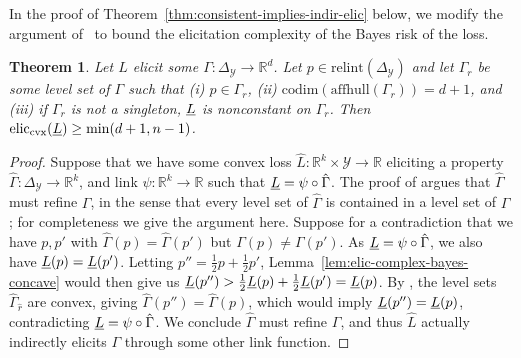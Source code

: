 \documentclass{article}
\newcommand{\reals}{\mathbb{R}}
\newcommand{\simplex}{\Delta_\Y}
\newcommand{\relint}[1]{\mathrm{relint}(#1)}
\newcommand{\eliccvx}{\mathrm{elic}_\mathrm{cvx}}
\newcommand{\codim}{\mathrm{codim}}
\newcommand{\affhull}{\mathrm{affhull}}
\newcommand{\Y}{\mathcal{Y}}
\newtheorem{theorem}{Theorem}
\begin{document}
In the proof of Theorem~\ref{thm:consistent-implies-indir-elic} below, we modify the argument of~\citet[Corollary 7]{frongillo2018elicitation} to bound the elicitation complexity of the Bayes risk of the loss.
\begin{theorem}
  \label{thm:bayes-risk-lower-bound}
  Let $L$ elicit some $\Gamma:\simplex\to\reals^d$.
  Let $p\in\relint\simplex$ and let $\Gamma_r$ be some level set of $\Gamma$ such that (i) $p\in\Gamma_r$, (ii) $\codim(\affhull(\Gamma_r))=d+1$, and (iii) if $\Gamma_r$ is not a singleton, $\underline{L}$ is nonconstant on $\Gamma_r$.
  Then $\eliccvx(\lbar) \geq \min(d+1,n-1)$.
\end{theorem}
\begin{proof}
  Suppose that we have some convex loss $\hat L:\reals^k\times\Y\to\reals$ eliciting a property $\hat\Gamma:\simplex\to\reals^k$, and link $\psi : \reals^k \to \reals$ such that $\underline{L} = \psi \circ \hat\Gamma$.
  The proof of \citet[Theorem 4]{frongillo2018elicitation} argues that $\hat\Gamma$ must refine $\Gamma$, in the sense that every level set of $\hat\Gamma$ is contained in a level set of $\Gamma$; for completeness we give the argument here.
  Suppose for a contradiction that we have $p,p'$ with $\hat\Gamma(p)=\hat\Gamma(p')$ but $\Gamma(p) \neq \Gamma(p')$.
  As $\underline{L} = \psi \circ \hat\Gamma$, we also have $\underline{L}(p) = \underline{L}(p')$.
  Letting $p'' = \tfrac 1 2 p +  \tfrac 1 2 p'$, Lemma~\ref{lem:elic-complex-bayes-concave} would then give us $\underline{L}(p'') >  \tfrac 1 2 \underline{L}(p) +  \tfrac 1 2 \underline{L}(p') = \underline{L}(p)$.
  By \citet{osband1985providing}, the level sets $\hat\Gamma_{\hat r}$ are convex, giving $\hat\Gamma(p'') = \hat\Gamma(p)$, which would imply $\underline{L}(p'')=\underline{L}(p)$, contradicting $\underline{L} = \psi \circ \hat\Gamma$.
  We conclude $\hat\Gamma$ must refine $\Gamma$, and thus $\hat L$ actually indirectly elicits $\Gamma$ through some other link function.


\end{proof}
\end{document}
